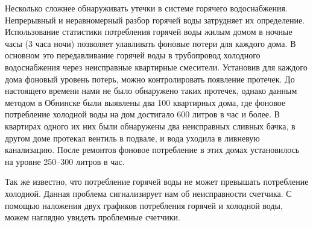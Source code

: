 Несколько сложнее обнаруживать утечки в системе горячего водоснабжения. Непрерывный и неравномерный разбор горячей воды затрудняет их определение. Использование статистики потребления горячей воды жилым домом в ночные часы (3 часа ночи) позволяет улавливать фоновые потери для каждого дома. В основном это передавливание горячей воды в трубопровод холодного водоснабжения через неисправные квартирные смесители. Установив для каждого дома фоновый уровень потерь, можно контролировать появление протечек. До настоящего времени нами не было обнаружено таких протечек, однако данным методом в Обнинске были выявлены два 100 квартирных дома, где фоновое потребление холодной воды на дом достигало 600 литров
в час и более. В квартирах одного их них были обнаружены два неисправных сливных бачка, в другом доме протекал вентиль в подвале, и вода уходила в ливневую канализацию. После ремонтов фоновое потребление в этих домах установилось на уровне 250–300 литров в час. \cite{journal2}

Так же известно, что потребление горячей воды не может превышать потребление холодной. Данная проблема сигнализирует нам об неисправности счетчика. С помощью наложения двух графиков потребления горячей и холодной воды, можем наглядно увидеть проблемные счетчики.